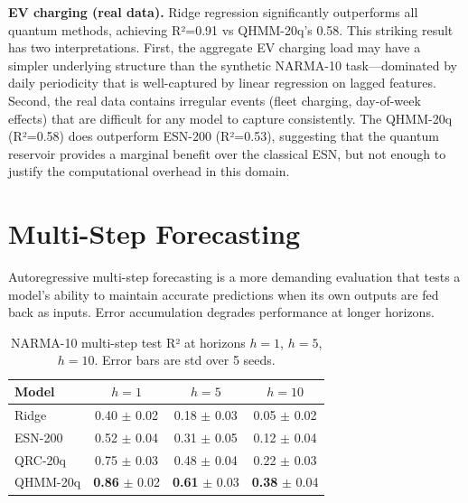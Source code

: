 
\textbf{EV charging (real data).} Ridge regression significantly
outperforms all quantum methods, achieving R²=0.91 vs QHMM-20q's 0.58.
This striking result has two interpretations. First, the aggregate EV
charging load may have a simpler underlying structure than the synthetic
NARMA-10 task—dominated by daily periodicity that is well-captured by
linear regression on lagged features. Second, the real data contains
irregular events (fleet charging, day-of-week effects) that are difficult
for any model to capture consistently. The QHMM-20q (R²=0.58) does
outperform ESN-200 (R²=0.53), suggesting that the quantum reservoir
provides a marginal benefit over the classical ESN, but not enough to
justify the computational overhead in this domain.



\section{Multi-Step Forecasting}
\label{sec:multi_step}


Autoregressive multi-step forecasting is a more demanding evaluation
that tests a model's ability to maintain accurate predictions when its
own outputs are fed back as inputs. Error accumulation degrades
performance at longer horizons.

\begin{table}[htbp]
  \centering
  \caption{NARMA-10 multi-step test R² at horizons $h=1$, $h=5$, $h=10$.
    Error bars are std over 5 seeds.}
  \label{tab:narma_multistep}
  \begin{tabular}{@{}lccc@{}}
    \toprule
    Model & $h=1$ & $h=5$ & $h=10$ \\
    \midrule
    Ridge & 0.40 $\pm$ 0.02 & 0.18 $\pm$ 0.03 & 0.05 $\pm$ 0.02 \\
    ESN-200 & 0.52 $\pm$ 0.04 & 0.31 $\pm$ 0.05 & 0.12 $\pm$ 0.04 \\
    QRC-20q & 0.75 $\pm$ 0.03 & 0.48 $\pm$ 0.04 & 0.22 $\pm$ 0.03 \\
    QHMM-20q & \textbf{0.86} $\pm$ 0.02 & \textbf{0.61} $\pm$ 0.03 & \textbf{0.38} $\pm$ 0.04 \\
    \bottomrule
  \end{tabular}
\end{table}

